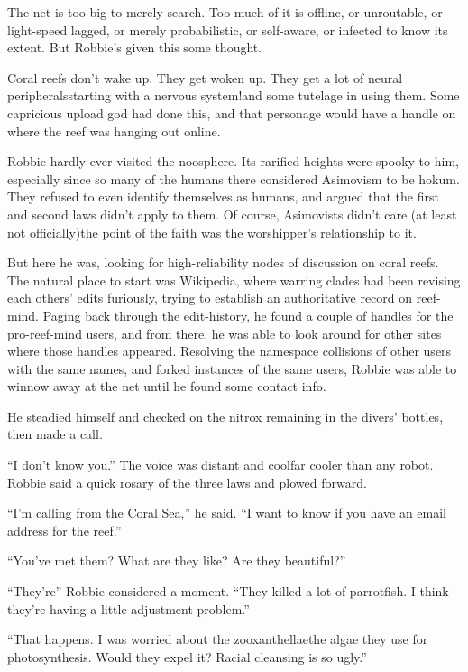 The net is too big to merely search. Too much of it is offline, or
unroutable, or light-speed lagged, or merely probabilistic, or
self-aware, or infected to know its extent. But Robbie’s given this
some thought.

Coral reefs don’t wake up. They get woken up. They get a lot of
neural peripherals\dash{}starting with a nervous system!\dash{}and some
tutelage in using them. Some capricious upload god had done this,
and that personage would have a handle on where the reef was
hanging out online.

Robbie hardly ever visited the noosphere. Its rarified heights were
spooky to him, especially since so many of the humans there
considered Asimovism to be hokum. They refused to even identify
themselves as humans, and argued that the first and second laws
didn’t apply to them. Of course, Asimovists didn’t care (at least
not officially)\dash{}the point of the faith was the worshipper’s
relationship to it.

But here he was, looking for high-reliability nodes of discussion
on coral reefs. The natural place to start was Wikipedia, where
warring clades had been revising each others’ edits furiously,
trying to establish an authoritative record on reef-mind. Paging
back through the edit-history, he found a couple of handles for the
pro-reef-mind users, and from there, he was able to look around for
other sites where those handles appeared. Resolving the namespace
collisions of other users with the same names, and forked instances
of the same users, Robbie was able to winnow away at the net until
he found some contact info.

He steadied himself and checked on the nitrox remaining in the
divers’ bottles, then made a call.

“I don’t know you.” The voice was distant and cool\dash{}far cooler than
any robot. Robbie said a quick rosary of the three laws and plowed
forward.

“I’m calling from the Coral Sea,” he said. “I want to know if you
have an email address for the reef.”

“You’ve met them? What are they like? Are they beautiful?”

“They’re\dash{}” Robbie considered a moment. “They killed a lot of
parrotfish. I think they’re having a little adjustment problem.”

“That happens. I was worried about the zooxanthellae\dash{}the algae they
use for photosynthesis. Would they expel it? Racial cleansing is so
ugly.”

